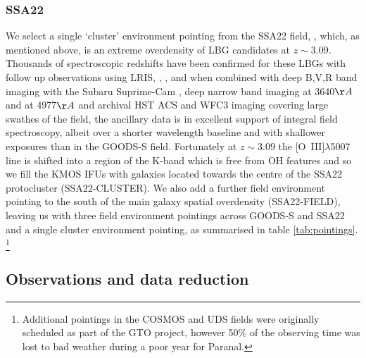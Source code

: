 \documentclass[fleqn,usenatbib]{mn2e}
\begin{document}
\subsubsection{SSA22}\label{subsubsec:sample_selection_ssa}
We select a single `cluster' environment pointing from the SSA22 field, \citep{Steidel1998,Steidel2000,Steidel2003,Shapley2003}, which, as mentioned above, is an extreme overdensity of LBG candidates at $z \sim 3.09$.
Thousands of spectroscopic redshifts have been confirmed for these LBGs with follow up observations using LRIS, \citep{Shapley2003}, \citep{Nestor2013}, and when combined with deep B,V,R band imaging with the Subaru Suprime-Cam \citep{Matsuda2004}, deep narrow band imaging at 3640$\AA$ \citep{Matsuda2004} and at 4977$\AA$ \citep{Nestor2011} and archival HST ACS and WFC3 imaging covering large swathes of the field, the ancillary data is in excellent support of integral field spectroscopy, albeit over a shorter wavelength baseline and with shallower exposures than in the GOODS-S field.
Fortunately at $z \sim 3.09$ the [O~{\sc III}]$\lambda$5007 line is shifted into a region of the K-band which is free from OH features and so we fill the KMOS IFUs with galaxies located towards the centre of the SSA22 protocluster (SSA22-CLUSTER). We also add a further field environment pointing to the south of the main galaxy spatial overdensity (SSA22-FIELD), leaving us with three field environment pointings across GOODS-S and SSA22 and a single cluster environment pointing, as summarised in table \ref{tab:pointings}. \footnote{Additional pointings in the COSMOS and UDS fields were originally scheduled as part of the GTO project, however 50$\%$ of the observing time was lost to bad weather during a poor year for Paranal.}

\subsection{Observations and data reduction}\label{subsubsec:observations_and_dr}
\end{document}
